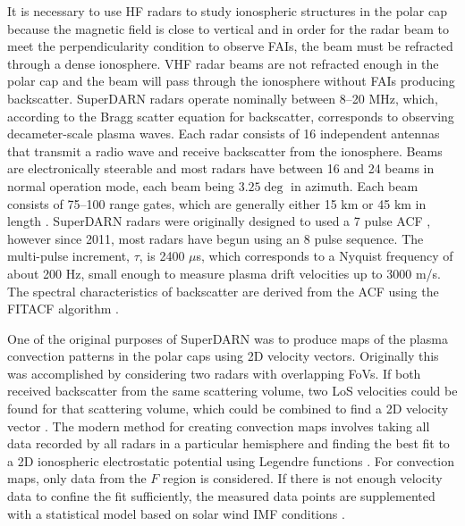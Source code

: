 It is necessary to use HF radars to study ionospheric structures in the polar cap because the magnetic field is close to vertical and in order for the radar beam to meet the perpendicularity condition to observe FAIs, the beam must be refracted through a dense ionosphere.  VHF radar beams are not refracted enough in the polar cap and the beam will pass through the ionosphere without FAIs producing backscatter.  SuperDARN radars operate nominally between 8--20 MHz, which, according to the Bragg scatter equation for backscatter, corresponds to observing decameter-scale plasma waves.  Each radar consists of 16 independent antennas that transmit a radio wave and receive backscatter from the ionosphere.  Beams are electronically steerable and most radars have between 16 and 24 beams in normal operation mode, each beam being \(3.25\deg\) in azimuth.  Each beam consists of 75--100 range gates, which are generally either 15 km or 45 km in length \citep{Chisham2007}.  SuperDARN radars were originally designed to used a 7 pulse ACF \citep{Farley1972,Greenwald1983,Greenwald1985}, however since 2011, most radars have begun using an 8 pulse sequence.   The multi-pulse increment, \(\tau\), is 2400 \(\mu\)s, which corresponds to a Nyquist frequency of about 200 Hz, small enough to measure plasma drift velocities up to 3000 m/s.  The spectral characteristics of backscatter are derived from the ACF using the FITACF algorithm \citep{Ponomarenko2006}.

One of the original purposes of SuperDARN was to produce maps of the plasma convection patterns in the polar caps using 2D velocity vectors.  Originally this was accomplished by considering two radars with overlapping FoVs.  If both received backscatter from the same scattering volume, two LoS velocities could be found for that scattering volume, which could be combined to find a 2D velocity vector \citep{Ruohoniemi1989}.  The modern method for creating convection maps involves taking all data recorded by all radars in a particular hemisphere and finding the best fit to a 2D ionospheric electrostatic potential using Legendre functions \citep{Ruohoniemi1998}.  For convection maps, only data from the \(F\) region is considered.  If there is not enough velocity data to confine the fit sufficiently, the measured data points are supplemented with a statistical model based on solar wind IMF conditions \citep{Ruohoniemi1995,Ruohoniemi2005}.

